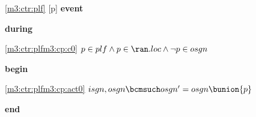 \noindent \ref{m3:ctr:plf} [p] \textbf{event}
\begin{block}
  \item   \textbf{during}
  \begin{block}
  \item[ \eqref{m3:ctr:plfm3:cp:c0} ]$p \in plf \land p \in \ran.loc \land \neg p \in osgn $ %
  \end{block}
  \item   \textbf{begin}
  \begin{block}
  \item[ \eqref{m3:ctr:plfm3:cp:act0} ]$isgn,osgn \bcmsuch osgn' = osgn \bunion \{ p \} $ %
  \end{block}
  \item   \textbf{end} \\
\end{block}
